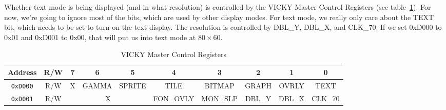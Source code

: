 Whether text mode is being displayed (and in what resolution) is controlled by the VICKY Master Control Registers (see table~\ref{tab:vky_master_ctrl_reg}). For now, we're going to ignore most of the bits, which are used by other display modes. For text mode, we really only care about the TEXT bit, which needs to be set to turn on the text display. The resolution is controlled by DBL\_Y, DBL\_X, and CLK\_70. If we set 0xD000 to 0x01 and 0xD001 to 0x00, that will put us into text mode at $80 \times 60$.

\begin{table}[ht]
    \begin{center}
        \begin{tabular}{|c|c|c|c|c|c|c|c|c|c|} \hline
            Address & R/W & 7 & 6 & 5 & 4 & 3 & 2 & 1 & 0 \\ \hline\hline
            \verb+0xD000+ & R/W & X & GAMMA & SPRITE & TILE & BITMAP & GRAPH & OVRLY & TEXT \\ \hline
            \verb+0xD001+ & R/W & \multicolumn{3}{|c|}{X} & FON\_OVLY & MON\_SLP & DBL\_Y & DBL\_X & CLK\_70 \\ \hline
        \end{tabular}
    \end{center}
    \caption{VICKY Master Control Registers}
    \label{tab:vky_master_ctrl_reg}
\end{table}

